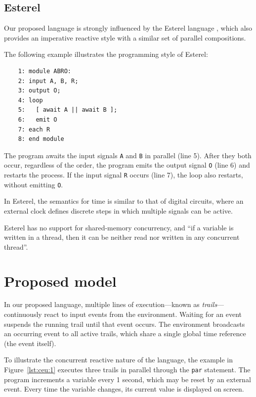 \documentclass[pdftex,12pt,a4paper]{article}
\newcommand{\code}[1] {{\small{\texttt{#1}}}}
\begin{document}
\subsection{Esterel}

Our proposed language is strongly influenced by the Esterel language 
\cite{esterel.design}, which also provides an imperative reactive style with a 
similar set of parallel compositions.

The following example illustrates the programming style of Esterel:

{\small
\begin{verbatim}
    1: module ABRO:
    2: input A, B, R;
    3: output O;
    4: loop
    5:   [ await A || await B ];
    6:   emit O
    7: each R
    8: end module
\end{verbatim}
}

The program awaits the input signals \code{A} and \code{B} in parallel (line 
5).
After they both occur, regardless of the order, the program emits the output 
signal \code{O} (line 6) and restarts the process.
If the input signal \code{R} occurs (line 7), the loop also restarts, without 
emitting \code{O}.

In Esterel, the semantics for time is similar to that of digital circuits, 
where an external clock defines discrete steps in which multiple signals can be 
active.

Esterel has no support for shared-memory concurrency, and ``if a variable is 
written in a thread, then it can be neither read nor written in any concurrent 
thread''.~\cite{esterel.primer}

\section{Proposed model}

In our proposed language, multiple lines of execution---known as 
\emph{trails}---continuously react to input events from the environment.
Waiting for an event suspends the running trail until that event occurs.
The environment broadcasts an occurring event to all active trails, which share 
a single global time reference (the event itself).

To illustrate the concurrent reactive nature of the language, the example in 
Figure~\ref{lst:ceu:1} executes three trails in parallel through the \code{par} 
statement.
The program increments a variable every 1 second, which may be reset by an 
external event.
Every time the variable changes, its current value is displayed on screen.
\end{document}

